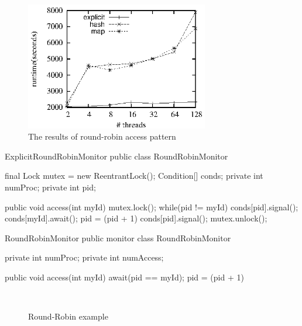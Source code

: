\documentclass[10pt, conference, compsocconf]{IEEEtran}
\begin{document}
\begin{figure}[ht!]
  \centering
  \includegraphics[width=80mm]{fig/rr.eps}
  \caption{The results of round-robin access pattern}
  \label{fig:rr_eval}
\end{figure}
\begin{SaveVerbatim}{ExplicitRoundRobinMonitor}
public class RoundRobinMonitor{
  final Lock mutex = new ReentrantLock();
  Condition[] conds;
  private int numProc;
  private int pid;

  public void access(int myId) {
    mutex.lock();
    while(pid != myId) {
      conds[pid].signal();
      conds[myId].await();
    }
    pid = (pid + 1) %
    conds[pid].signal();
    mutex.unlock();
  }
}
\end{SaveVerbatim}
\begin{SaveVerbatim}{RoundRobinMonitor}
public monitor class RoundRobinMonitor{
  private int numProc;
  private int numAccess;

  public void access(int myId) {
    await(pid == myId);
    pid = (pid + 1) %
  }
}
\end{SaveVerbatim}
\begin{figure}
  \centering
  \\
  \caption{Round-Robin example}
  \label{fig:rbb_exp}
\end{figure}
\end{document}

